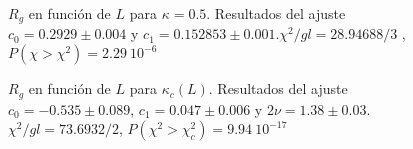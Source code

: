 \begin{figure}[h]
  \centering
  
   \caption{$R_g$ en función de $L$ para $\kappa=0.5$. Resultados del ajuste
     $c_0=0.2929 \pm 0.004$ y $c_1=0.152853\pm 0.001$.$\chi^2/gl=28.94688/3$ ,
     $P(\chi>\chi^2)=2.29\ 10^{-6}$}







\end{figure}

\begin{figure}[h]
  \centering
  
  \caption{$R_g$ en función de $L$ para $\kappa_c(L)$. Resultados del ajuste
    $c_0=-0.535 \pm 0.089$, $c_1=0.047\pm 0.006$ y $2\nu=1.38\pm
    0.03$. $\chi^2/gl=73.6932/2$, $P(\chi^2>\chi_c^2)=9.94 \ 10^{-17}$}







\end{figure}

\clearpage

